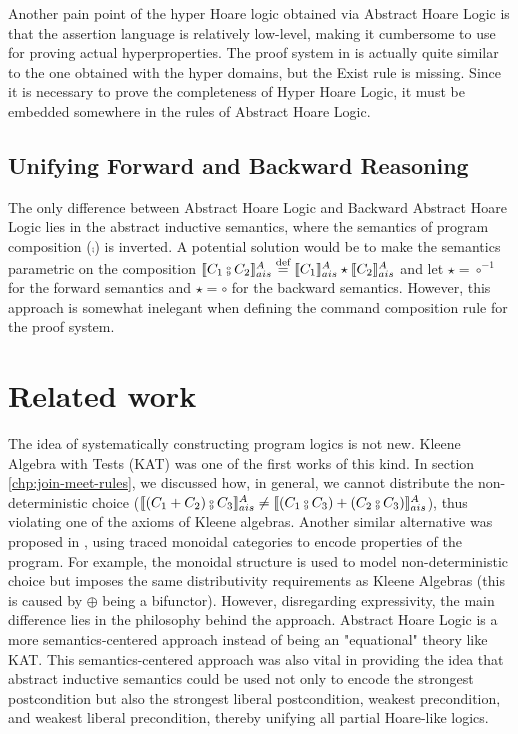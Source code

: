 \documentclass[
  10pt,       %
  twoside,    %
  a4paper,    %
  english,    %
  tikz,       %
  openright,  %
]{book}
\begin{document}
Another pain point of the hyper Hoare logic obtained via Abstract Hoare Logic
is that the assertion language is relatively low-level, making it cumbersome to
use for proving actual hyperproperties. The proof system in \cite{Darnier2023}
is actually quite similar to the one obtained with the hyper domains, but the
Exist rule is missing. Since it is necessary to prove the completeness of Hyper
Hoare Logic, it must be embedded somewhere in the rules of Abstract Hoare
Logic.

\subsection{Unifying Forward and Backward Reasoning}
The only difference between Abstract Hoare Logic and Backward Abstract Hoare
Logic lies in the abstract inductive semantics, where the semantics of program
composition ($\fcmp$) is inverted. A potential solution would be to make the
semantics parametric on the composition $\asem{C_1 \fcmp C_2} \defeq \asem{C_1}
\star \asem{C_2}$ and let $\star = \circ^{-1}$ for the forward semantics and
$\star = \circ$ for the backward semantics. However, this approach is somewhat
inelegant when defining the command composition rule for the proof system.

\section{Related work}

The idea of systematically constructing program logics is not new. Kleene
Algebra with Tests (KAT) \cite{Kozen97} was one of the first works of this
kind. In section \ref{chp:join-meet-rules}, we discussed how, in general, we
cannot distribute the non-deterministic choice ($\asem{(C_1 + C_2) \fcmp C_3} \neq
\asem{(C_1 \fcmp C_3) + (C_2 \fcmp C_3)}$), thus violating one of the axioms of
Kleene algebras. Another similar alternative was proposed in \cite{Martin06},
using traced monoidal categories to encode properties of the program. For
example, the monoidal structure is used to model non-deterministic choice but
imposes the same distributivity requirements as Kleene Algebras (this is caused
by $\oplus$ being a bifunctor). However, disregarding expressivity, the main
difference lies in the philosophy behind the approach. Abstract Hoare Logic is
a more semantics-centered approach instead of being an "equational" theory like
KAT. This semantics-centered approach was also vital in providing the idea that
abstract inductive semantics could be used not only to encode the strongest
postcondition but also the strongest liberal postcondition, weakest
precondition, and weakest liberal precondition, thereby unifying all partial
Hoare-like logics.
\end{document}
